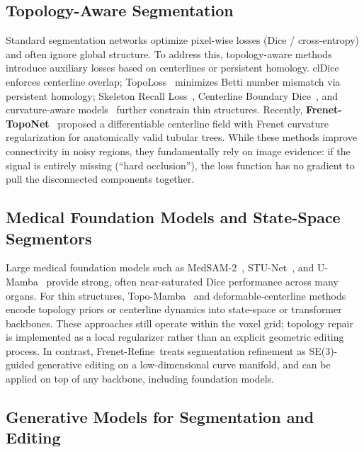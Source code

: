 \documentclass{article}
\newcommand{\modelname}{Frenet-Refine}
\newcommand{\stageone}{Frenet-TopoNet}
\begin{document}
\subsection{Topology-Aware Segmentation}

Standard segmentation networks optimize pixel-wise losses (Dice / cross-entropy) and often ignore global structure. To address this, topology-aware methods introduce auxiliary losses based on centerlines or persistent homology. clDice~\cite{shit2021cldice} enforces centerline overlap; TopoLoss~\cite{clough2020topological,hu2021topoloss} minimizes Betti number mismatch via persistent homology; Skeleton Recall Loss~\cite{wagner2024skeleton}, Centerline Boundary Dice~\cite{shi2024centerlineboundarydice}, and curvature-aware models~\cite{lee2023curvnet,su2022frenet} further constrain thin structures. Recently, \textbf{\stageone}~\cite{anonymous_ijcai} proposed a differentiable centerline field with Frenet curvature regularization for anatomically valid tubular trees. While these methods improve connectivity in noisy regions, they fundamentally rely on image evidence: if the signal is entirely missing (``hard occlusion''), the loss function has no gradient to pull the disconnected components together.

\subsection{Medical Foundation Models and State-Space Segmentors}

Large medical foundation models such as MedSAM-2~\cite{wu2025medsam2}, STU-Net~\cite{huang2024stu}, and U-Mamba~\cite{ma2024umamba} provide strong, often near-saturated Dice performance across many organs. For thin structures, Topo-Mamba~\cite{gu2025topomamba} and deformable-centerline methods~\cite{zhao2025deformcl,chen2025dynamic} encode topology priors or centerline dynamics into state-space or transformer backbones. These approaches still operate within the voxel grid; topology repair is implemented as a local regularizer rather than an explicit geometric editing process. In contrast, \modelname\ treats segmentation refinement as SE(3)-guided generative editing on a low-dimensional curve manifold, and can be applied on top of any backbone, including foundation models.

\subsection{Generative Models for Segmentation and Editing}
\end{document}
